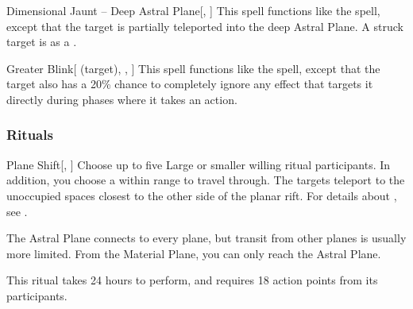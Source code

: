 \lowercase{\hypertarget{spell:Dimensional Jaunt -- Deep Astral Plane}{}}\label{spell:Dimensional Jaunt -- Deep Astral Plane}
\begin{freeability}[\nth{7}]{\hypertarget{spell:Dimensional Jaunt -- Deep Astral Plane}{Dimensional Jaunt -- Deep Astral Plane}}[, ]
This spell functions like the  spell, except that the target is partially teleported into the deep Astral Plane.
A struck target is  as a .
\end{freeability}
\vspace{0.25em}



\lowercase{\hypertarget{spell:Greater Blink}{}}\label{spell:Greater Blink}
\begin{attuneability}[\nth{7}]{\hypertarget{spell:Greater Blink}{Greater Blink}}[ (target), , ]
This spell functions like the  spell, except that the target also has a 20\% chance to completely ignore any effect that targets it directly during phases where it takes an action.
\end{attuneability}
\vspace{0.25em}



\subsubsection{Rituals}


\lowercase{\hypertarget{spell:Plane Shift}{}}\label{spell:Plane Shift}
\begin{freeability}[\nth{3}]{\hypertarget{spell:Plane Shift}{Plane Shift}}[, ]
Choose up to five Large or smaller willing ritual participants.
In addition, you choose a  within \rngmed range to travel through.
The targets teleport to the unoccupied spaces closest to the other side of the planar rift.
For details about , see .

The Astral Plane connects to every plane, but transit from other planes is usually more limited.
From the Material Plane, you can only reach the Astral Plane.

This ritual takes 24 hours to perform, and requires 18 action points from its participants.
\end{freeability}
\vspace{0.25em}



